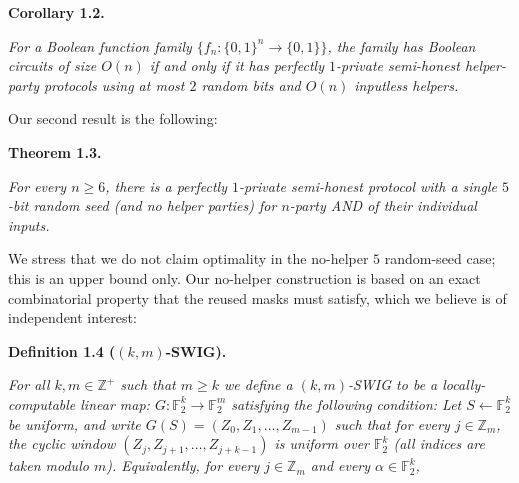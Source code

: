 \par\medskip\noindent\textbf{
\textbf{Corollary 1.2}\textbf{.}
}\par



\emph{For a Boolean function family $\{f_{n}:\{0,1\}^{n}\to\{0,1\}\}$, the family has Boolean circuits of size $O(n)$ if and only if it has perfectly $1$-private semi-honest helper-party protocols using at most $2$ random bits and $O(n)$ inputless helpers.}\par






Our second result is the following:\par





\par\medskip\noindent\textbf{
\textbf{Theorem 1.3}\textbf{.}
}\par



\emph{For every $n\geq 6$, there is a perfectly $1$-private semi-honest protocol with a single $5$-bit random seed (and no helper parties) for $n$-party AND of their individual inputs.}\par






We stress that we do not claim optimality in the no-helper $5$ random-seed case; this is an upper bound only.
Our no-helper construction is based on an exact combinatorial property that the reused masks must satisfy, which we believe is of independent interest:\par





\par\medskip\noindent\textbf{
\textbf{Definition 1.4}\textbf{ }($(k,m)$-SWIG)\textbf{.}
}\par



\emph{For all $k,m\in\mathbb{Z}^{+}$ such that $m\geq k$ we define a $(k,m)$-SWIG to be a locally-computable linear map:
$G:\mathbb{F}_{2}^{k}\to\mathbb{F}_{2}^{m}$
satisfying the following condition: Let $S\leftarrow\mathbb{F}_{2}^{k}$ be uniform, and write
$G(S)=(Z_{0},Z_{1},\ldots,Z_{m-1})$
such that for every $j\in\mathbb{Z}_{m}$, the cyclic window
$(Z_{j},Z_{j+1},\ldots,Z_{j+k-1})$
is uniform over $\mathbb{F}_{2}^{k}$ (all indices are taken modulo $m$). Equivalently, for every $j\in\mathbb{Z}_{m}$ and every $\alpha\in\mathbb{F}_{2}^{k}$,}\par


